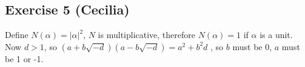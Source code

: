 \subsection*{Exercise 5 (Cecilia)}
Define $ N(\alpha) = |\alpha|^2 $, $ N $ is multiplicative, therefore $ N(\alpha) = 1 $ if $ \alpha $ is a unit. Now $ d > 1 $, so $ (a + b\sqrt{-d})(a - b\sqrt{-d}) = a^2 + b^2d $ , so $ b $ must be 0, $ a $ must be 1 or -1.